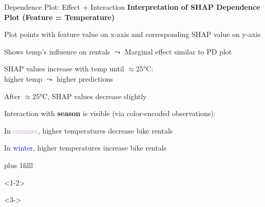 \documentclass[10pt,compress,t,notes=noshow, xcolor=table]{beamer}
\newcommand{\btVFill}{\vskip0pt plus 1filll}
\begin{document}
\begin{framev}[align=top]{Dependence Plot: Effect + Interaction}
\textbf{Interpretation of SHAP Dependence Plot (Feature = Temperature)}
\begin{itemizeM}
\item<1-> Plot points with feature value on x-axis and corresponding SHAP value on y-axis
\item<2-> Shows temp's influence on rentals $\leadsto$ Marginal effect similar to PD plot
\item<2-> SHAP values increase with temp until $\approx$25°C:\\
higher temp $\leadsto$ higher predictions
\item<2-> After $\approx$25°C, SHAP values decrease slightly %
\item<3-> Interaction with \textbf{season} is visible (via color-encoded observations):
\begin{itemizeS}
\item In \textcolor{violet}{summer}, higher temperatures decrease bike rentals
\item In \textcolor{blue}{winter}, higher temperatures increase bike rentals
\end{itemizeS}
\end{itemizeM}
\btVFill
\begin{onlyenv}<1-2>
\centering
{}
\par
\end{onlyenv}
\begin{onlyenv}<3->
\centering
{}
\par
\end{onlyenv}
\end{framev}
\end{document}
